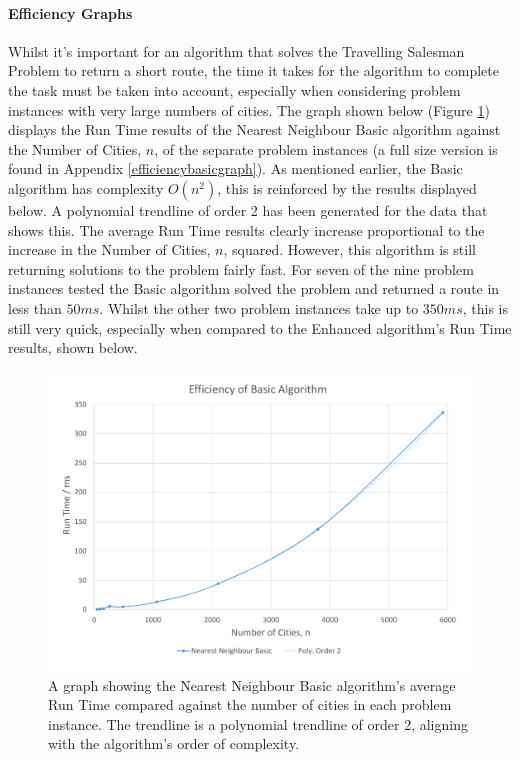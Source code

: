 \documentclass[conference,backref=page]{acmsiggraph}
\begin{document}
\paragraph{Efficiency Graphs}
Whilst it's important for an algorithm that solves the Travelling Salesman Problem to return a short route, the time it takes for the algorithm to complete the task must be taken into account, especially when considering problem instances with very large numbers of cities. The graph shown below (Figure \ref{efficiencybasiccolumngraph}) displays the Run Time results of the Nearest Neighbour Basic algorithm against the Number of Cities, $n$, of the separate problem instances (a full size version is found in Appendix \ref{efficiencybasicgraph}). As mentioned earlier, the Basic algorithm has complexity $O(n^2)$, this is reinforced by the results displayed below. A polynomial trendline of order 2 has been generated for the data that shows this. The average Run Time results clearly increase proportional to the increase in the Number of Cities, $n$, squared. However, this algorithm is still returning solutions to the problem fairly fast. For seven of the nine problem instances tested the Basic algorithm solved the problem and returned a route in less than $50ms$. Whilst the other two problem instances take up to $350ms$, this is still very quick, especially when compared to the Enhanced algorithm's Run Time results, shown below.

\begin{figure}[h]
	\includegraphics[width=\columnwidth]{images/efficiency_basic_column.pdf}
	\caption{A graph showing the Nearest Neighbour Basic algorithm's average Run Time compared against the number of cities in each problem instance. The trendline is a polynomial trendline of order 2, aligning with the algorithm's order of complexity.}
	\label{efficiencybasiccolumngraph}
\end{figure}
\end{document}
